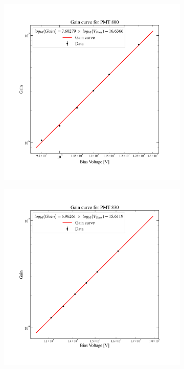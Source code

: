 \begin{figure}[ht!]
     \centering
     \begin{subfigure}[b]{0.47\textwidth}
         \centering
         \includegraphics[width=\textwidth]{figures/ODCommissioning/PMT800_GainCurve.png}
     \end{subfigure}
     \hfill
     \begin{subfigure}[b]{0.47\textwidth}
         \centering
         \includegraphics[width=\textwidth]{figures/ODCommissioning/PMT830_GainCurve.png}

\end{subfigure}
\end{figure}
